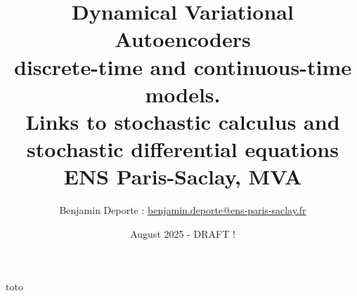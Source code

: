 \documentclass[12pt, aspectratio=169, 169]{beamer}
\title{Dynamical Variational Autoencoders\\ discrete-time and continuous-time models.\\ Links to stochastic calculus and stochastic differential equations\\
\vspace{2cm}
{\Large{ENS Paris-Saclay, MVA}}}
\author{
Benjamin Deporte : \href{mailto:benjamin.deporte@ens-paris-saclay.fr}{benjamin.deporte@ens-paris-saclay.fr}%
}
\date{August 2025 - DRAFT !}
\begin{document}
\begin{frame}
    toto
\end{frame}
\end{document}
